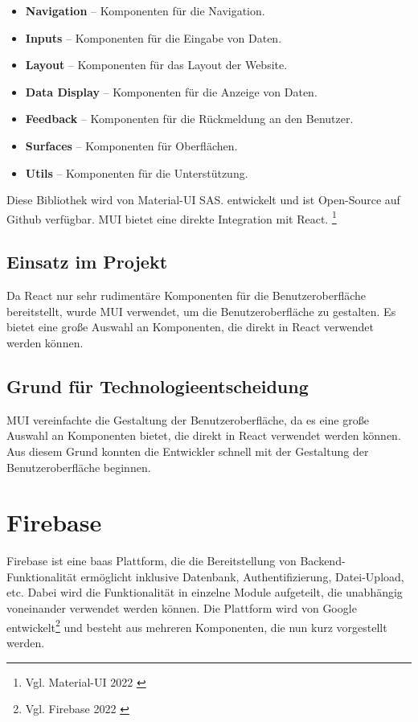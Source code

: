 \begin{itemize}
  \item \textbf{Navigation} – Komponenten für die Navigation.
  \item \textbf{Inputs} – Komponenten für die Eingabe von Daten.
  \item \textbf{Layout} – Komponenten für das Layout der Website.
  \item \textbf{Data Display} – Komponenten für die Anzeige von Daten.
  \item \textbf{Feedback} – Komponenten für die Rückmeldung an den Benutzer.
  \item \textbf{Surfaces} – Komponenten für Oberflächen.
  \item \textbf{Utils} – Komponenten für die Unterstützung.
\end{itemize}

Diese Bibliothek wird von Material-UI SAS. entwickelt und ist Open-Source auf Github verfügbar.
MUI bietet eine direkte Integration mit React. \footnote{Vgl. Material-UI 2022 \cite{mui2022}}

\subsection{Einsatz im Projekt}
\label{sub:material-uiUsage}

Da React nur sehr rudimentäre Komponenten für die Benutzeroberfläche bereitstellt, wurde MUI verwendet, um die Benutzeroberfläche zu gestalten.
Es bietet eine große Auswahl an Komponenten, die direkt in React verwendet werden können.

\subsection{Grund für Technologieentscheidung}
\label{sub:material-uiReason}

MUI vereinfachte die Gestaltung der Benutzeroberfläche, da es eine große Auswahl an Komponenten bietet, die direkt in React verwendet werden können.
Aus diesem Grund konnten die Entwickler schnell mit der Gestaltung der Benutzeroberfläche beginnen.

\section{Firebase}
\label{sec:firebase}

Firebase ist eine \gls{baas} Plattform, die die Bereitstellung von Backend-Funktionalität ermöglicht inklusive Datenbank, Authentifizierung, Datei-Upload, etc.
Dabei wird die Funktionalität in einzelne Module aufgeteilt, die unabhängig voneinander verwendet werden können.
Die Plattform wird von Google entwickelt\footnote{Vgl. Firebase 2022 \cite{firebase2022}} und besteht aus mehreren Komponenten, die nun kurz vorgestellt werden.

